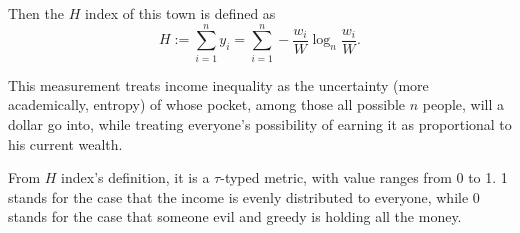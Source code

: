 \documentclass[12pt]{article}%
\begin{document}
Then the $H$ index of this town is defined as 
$$H:=\sum_{i=1}^{n}y_i= \sum_{i=1}^n -\frac{w_i}{W}\log_{n}{\frac{w_i}{W}}.$$

This measurement treats income inequality as the uncertainty 
(more academically, entropy) of 
whose pocket, among those all possible $n$ people, will a dollar go into, 
while treating everyone's possibility of earning it as 
proportional to his current wealth.

From $H$ index's definition, it is a $\tau$-typed metric, 
with value ranges from 0 to 1. 
1 stands for the case that the income is evenly distributed to everyone,
while 0 stands for the case that 
someone evil and greedy is holding all the money.
\end{document}
